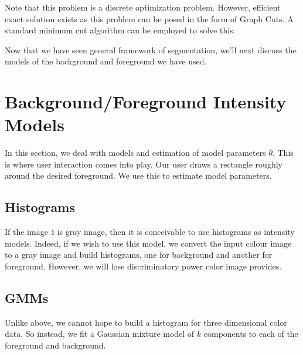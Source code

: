\documentclass[a4paper]{article}
\begin{document}
Note that this problem is a discrete optimization problem. 
However, efficient exact solution exists as this problem can be posed in the form of Graph Cuts.
A standard minimum cut algorithm \cite{2,3} can be employed to solve this.

Now that we have seen general framework of segmentation, we'll next discuss the models of the background and foreground we have used.

\section{Background/Foreground Intensity Models}
In this section, we deal with models and estimation of model parameters $\bar{\theta}$. This is where user interaction comes into play. Our user draws a rectangle roughly around the desired foreground. We use this to estimate model parameters.

\subsection{Histograms}
If the image $\bar{z}$ is gray image, then it is conceivable to use histograms as intensity models. Indeed, if we wish to use this model, we convert the input colour image to a gray image and build histograms, one for background and another for foreground. 
However, we will lose discriminatory power color image provides.

\subsection{GMMs}
Unlike above, we cannot hope to build a histogram for three dimensional color data. 
So instead, we fit a Gaussian mixture model of $k$ components to each of the foreground and background. 
\end{document}
